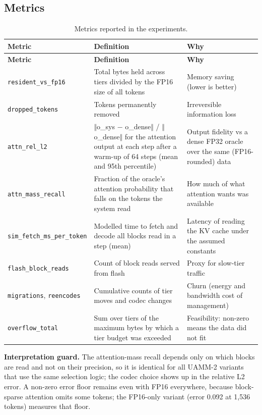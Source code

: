 \documentclass[12pt,a4paper]{report}
\begin{document}
\subsection{Metrics}\label{sec:7_3}
{\fontsize{8}{9.5}\selectfont\setlength{\tabcolsep}{3pt}
\begin{longtable}{>{\raggedright\arraybackslash}p{1.36in}>{\raggedright\arraybackslash}p{2.89in}>{\raggedright\arraybackslash}p{1.72in}}
\caption{Metrics reported in the experiments.}\\
\toprule
\textbf{Metric} & \textbf{Definition} & \textbf{Why} \\\midrule\endfirsthead
\toprule \textbf{Metric} & \textbf{Definition} & \textbf{Why} \\\midrule\endhead
\bottomrule\endfoot
\texttt{resident\_\allowbreak{}\allowbreak{}vs\_\allowbreak{}\allowbreak{}fp16} & Total bytes held across tiers divided by the FP16 size of all tokens & Memory saving (lower is better) \\
\texttt{dropped\_\allowbreak{}\allowbreak{}tokens} & Tokens permanently removed & Irreversible information loss \\
\texttt{attn\_\allowbreak{}\allowbreak{}rel\_\allowbreak{}\allowbreak{}l2} & \ensuremath{\Vert}o\_\allowbreak{}sys − o\_\allowbreak{}dense\ensuremath{\Vert} / \ensuremath{\Vert}o\_\allowbreak{}dense\ensuremath{\Vert} for the attention output at each step after a warm-up of 64 steps (mean and 95th percentile) & Output fidelity vs a dense FP32 oracle over the same (FP16-rounded) data \\
\texttt{attn\_\allowbreak{}\allowbreak{}mass\_\allowbreak{}\allowbreak{}recall} & Fraction of the oracle's attention probability that falls on the tokens the system read & How much of what attention wants was available \\
\texttt{sim\_\allowbreak{}\allowbreak{}fetch\_\allowbreak{}\allowbreak{}ms\_\allowbreak{}\allowbreak{}per\_\allowbreak{}\allowbreak{}token} & Modelled time to fetch and decode all blocks read in a step (mean) & Latency of reading the KV cache under the assumed constants \\
\texttt{flash\_\allowbreak{}\allowbreak{}block\_\allowbreak{}\allowbreak{}reads} & Count of block reads served from flash & Proxy for slow-tier traffic \\
\texttt{migrations}, \texttt{reencodes} & Cumulative counts of tier moves and codec changes & Churn (energy and bandwidth cost of management) \\
\texttt{overflow\_\allowbreak{}\allowbreak{}total} & Sum over tiers of the maximum bytes by which a tier budget was exceeded & Feasibility: non-zero means the data did not fit \\
\bottomrule
\end{longtable}}
\textbf{Interpretation guard.} The attention-mass recall depends only on which blocks are read and not on their precision, so it is identical for all UAMM-2 variants that use the same selection logic; the codec choice shows up in the relative L2 error. A non-zero error floor remains even with FP16 everywhere, because block-sparse attention omits some tokens; the FP16-only variant (error 0.092 at 1,536 tokens) measures that floor.
\end{document}

